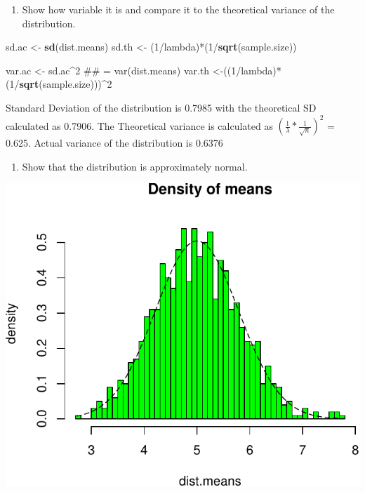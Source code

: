 \documentclass[]{article}
\newenvironment{Shaded}{\begin{snugshade}}{\end{snugshade}}
\newcommand{\KeywordTok}[1]{\textcolor[rgb]{0.13,0.29,0.53}{\textbf{{#1}}}}
\newcommand{\DecValTok}[1]{\textcolor[rgb]{0.00,0.00,0.81}{{#1}}}
\newcommand{\StringTok}[1]{\textcolor[rgb]{0.31,0.60,0.02}{{#1}}}
\newcommand{\NormalTok}[1]{{#1}}
\begin{document}
\begin{enumerate}
\def\labelenumi{\arabic{enumi}.}
\setcounter{enumi}{1}
\itemsep1pt\parskip0pt
\item
  Show how variable it is and compare it to the theoretical variance of
  the distribution.
\end{enumerate}

\begin{Shaded}
\begin{Highlighting}[]
\NormalTok{sd.ac <-}\StringTok{ }\KeywordTok{sd}\NormalTok{(dist.means)}
\NormalTok{sd.th <-}\StringTok{ }\NormalTok{(}\DecValTok{1}\NormalTok{/lambda)*(}\DecValTok{1}\NormalTok{/}\KeywordTok{sqrt}\NormalTok{(sample.size))}

\NormalTok{var.ac <-}\StringTok{ }\NormalTok{sd.ac^}\DecValTok{2} \NormalTok{## = var(dist.means)}
\NormalTok{var.th <-((}\DecValTok{1}\NormalTok{/lambda)*(}\DecValTok{1}\NormalTok{/}\KeywordTok{sqrt}\NormalTok{(sample.size)))^}\DecValTok{2}
\end{Highlighting}
\end{Shaded}

Standard Deviation of the distribution is 0.7985 with the theoretical SD
calculated as 0.7906. The Theoretical variance is calculated as
$(\frac{1}{\lambda} * \frac{1}{\sqrt{n}})^2$ = 0.625. Actual variance of
the distribution is 0.6376

\begin{enumerate}
\def\labelenumi{\arabic{enumi}.}
\setcounter{enumi}{2}
\itemsep1pt\parskip0pt
\item
  Show that the distribution is approximately normal.
\end{enumerate}

\includegraphics{./Q1_files/figure-latex/Q3.pdf}
\end{document}
